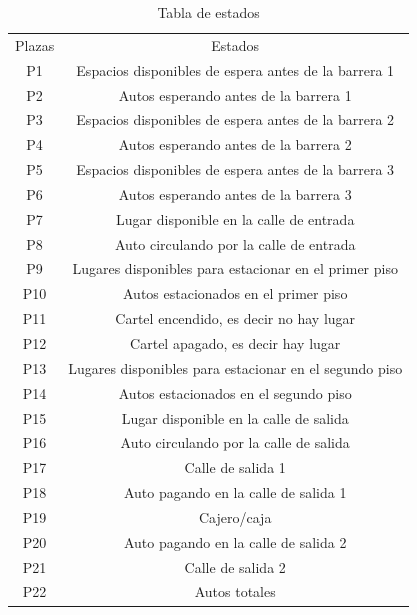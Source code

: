 \documentclass{article}
\begin{document}
	\begin{table}[h!]
		\begin{center}
		\begin{tabular}{ |c|c| } 
 			\hline
 			Plazas & Estados \\ 
 			P1 & Espacios disponibles de espera antes de la barrera 1 \\
 			P2 & Autos esperando antes de la barrera 1 \\
 			P3 & Espacios disponibles de espera antes de la barrera 2 \\
 			P4 & Autos esperando antes de la barrera 2 \\
 			P5 & Espacios disponibles de espera antes de la barrera 3 \\
 			P6 & Autos esperando antes de la barrera 3 \\ 
 			P7 & Lugar disponible en la calle de entrada \\
 			P8 & Auto circulando por la calle de entrada \\
 			P9 & Lugares disponibles para estacionar en el primer piso \\
 			P10 & Autos estacionados en el primer piso \\
 			P11 & Cartel encendido, es decir no hay lugar \\
 			P12 & Cartel apagado, es decir hay lugar \\
 			P13 & Lugares disponibles para estacionar en el segundo piso \\
 			P14 & Autos estacionados en el segundo piso \\
 			P15 & Lugar disponible en la calle de salida \\
 			P16 & Auto circulando por la calle de salida\\
 			P17 & Calle de salida 1\\
 			P18 & Auto pagando en la calle de salida 1 \\
 			P19 & Cajero/caja \\ 
 			P20 & Auto pagando en la calle de salida 2 \\
 			P21 &  Calle de salida 2\\
 			P22 & Autos totales \\
 			\hline
		\end{tabular}
		\end{center}
		\caption{Tabla de estados}
		\label{table:estados}
	\end{table}
\end{document}
